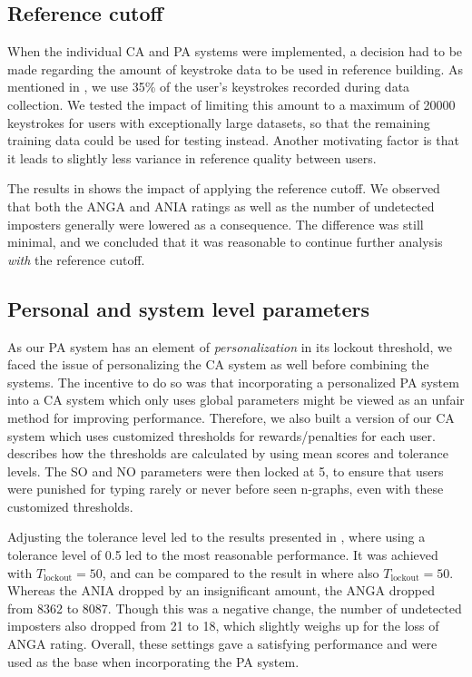 
\subsection{Reference cutoff}
\label{sec:analysis-cutoff}
When the individual CA and PA systems were implemented, a decision had to be made regarding the amount of keystroke data to be used in reference building.
As mentioned in , we use 35\% of the user's keystrokes recorded during data collection.
We tested the impact of limiting this amount to a maximum of 20000 keystrokes for users with exceptionally large datasets, so that the remaining training data could be used for testing instead.
Another motivating factor is that it leads to slightly less variance in reference quality between users.

The results in  shows the impact of applying the reference cutoff.
We observed that both the ANGA and ANIA ratings as well as the number of undetected imposters generally were lowered as a consequence.
The difference was still minimal, and we concluded that it was reasonable to continue further analysis \textit{with} the reference cutoff.

\subsection{Personal and system level parameters}
\label{sec:CA-personal-parameters}
As our PA system has an element of \textit{personalization} in its lockout threshold, we faced the issue of personalizing the CA system as well before combining the systems.
The incentive to do so was that incorporating a personalized PA system into a CA system which only uses global parameters might be viewed as an unfair method for improving performance.
Therefore, we also built a version of our CA system which uses customized thresholds for rewards/penalties for each user.
 describes how the thresholds are calculated by using mean scores and tolerance levels.
The SO and NO parameters were then locked at 5, to ensure that users were punished for typing rarely or never before seen n-graphs, even with these customized thresholds.

Adjusting the tolerance level led to the results presented in , where using a tolerance level of 0.5 led to the most reasonable performance.
It was achieved with $T_{\text{lockout}}=50$, and can be compared to the result in  where also $T_{\text{lockout}} = 50$.
Whereas the ANIA dropped by an insignificant amount, the ANGA dropped from 8362 to 8087.
Though this was a negative change, the number of undetected imposters also dropped from 21 to 18, which slightly weighs up for the loss of ANGA rating.
Overall, these settings gave a satisfying performance and were used as the base when incorporating the PA system.

